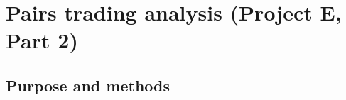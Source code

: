 %
%
%   
%

% 


\newcommand{\PairsTradingFigurePlaceholder}[4]{%
  \begin{figure}[htbp]%
    \centering%
    \fbox{\begin{minipage}{0.92\textwidth}%
      \centering\vspace*{18mm}%
      {\itshape #3\par}%
      \vspace*{18mm}%
    \end{minipage}}%
    \caption{#4}%
    \label{#1}%
  \end{figure}%
}

\section{Pairs trading analysis (Project E, Part 2)}
\label{sec:pairs-trading-project-e}

\subsection{Purpose and methods}
\label{subsec:pairs-purpose}

